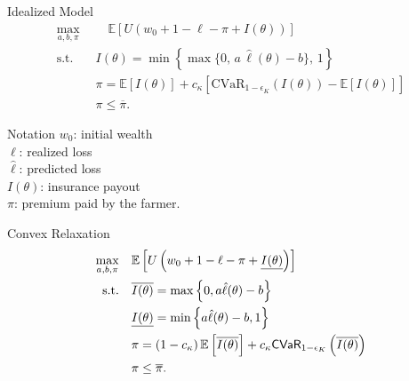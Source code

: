 \documentclass{beamer}
\begin{document}
\begin{frame}{Idealized Model}
  \small
  \begin{align}
      \max_{a,b,\pi}  & \quad \mathbb{E}\!\left[ U\!\left( w_0 + 1 - \ell - \pi + I(\theta) \right) \right] \label{cons-objective}\\
      \text{s.t.}\quad & I(\theta) =  \min \left\{\max \{0,\, a\,\hat{\ell}(\theta) - b \},\, 1 \right\} \label{cons-contract}\\
      & \pi = \mathbb{E}\!\left[ I(\theta) \right] + c_{\kappa} \left[ \mathrm{CVaR}_{1-\epsilon_K}\!\left( I(\theta)\right)  - \mathbb{E}[I(\theta)] \right] \\
      & \pi \leq \overline{\pi}.
  \end{align}
  
  \vspace{-0.25em}
  \begin{block}{\small Notation}
  \small
  \(w_0\): initial wealth \\
  \(\ell\): realized loss \\
  \(\hat{\ell}\): predicted loss \\
  \(I(\theta)\): insurance payout  \\
  \(\pi\): premium paid by the farmer.
  \end{block}
  \end{frame}


\begin{frame}{Convex Relaxation}
    \begin{align}
        \max_{a,b,\pi} &\quad \mathbb{E} \left [  U\left(w_0 + 1 - \ell - \pi  +  \underline{I(\theta)} \right) \right ]\nonumber\\
        \text{s.t.} & \quad \overline{I(\theta)} = \max \left \{0,a\hat{\ell}(\theta) - b \right \} \nonumber\\
        & \quad \underline{I(\theta)} = \min \left \{a\hat{\ell}(\theta)-b,1 \right \} \nonumber\\
        & \quad \pi = \left (1-c_{\kappa} \right ) \mathbb{E} \left [ \overline{I(\theta)} \right ] + c_{\kappa} {\sf CVaR}_{1-\epsilon_K} \left( \overline{I(\theta)} \right) \nonumber\\
        & \quad \pi \leq \overline{\pi} \nonumber.
  \end{align}
    
\end{frame}
\end{document}
